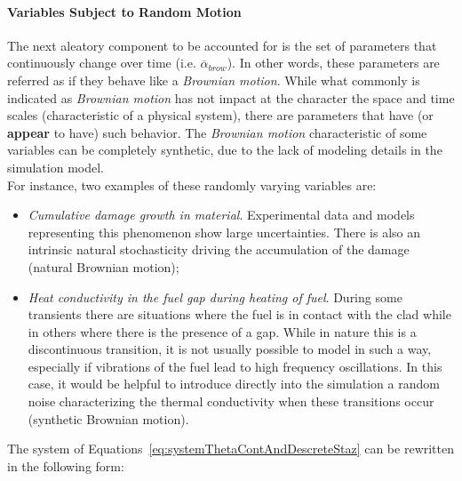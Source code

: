 \paragraph{Variables Subject to Random Motion}
The next aleatory component to be accounted for is the set of parameters that continuously change over time (i.e. $\overline{\alpha}_{brow}$). 
In other words,  these parameters are referred as if they behave like a \textit{Brownian motion}. 
While what commonly is indicated as \textit{Brownian motion} has not impact at the character
the space and time scales (characteristic of a physical system), there are parameters that have (or \textbf{appear} 
to have) such behavior. The  \textit{Brownian motion} characteristic of some variables can be completely 
synthetic, due to the lack of modeling details in the simulation model.
\\For instance, two examples of these randomly varying variables are:
\begin{itemize}
  \item \textit{Cumulative damage growth in material}. Experimental data and models representing this
  phenomenon show large uncertainties. There is also an intrinsic natural stochasticity driving
  the accumulation of the damage (natural Brownian motion);
  \item \textit{Heat conductivity in the fuel gap during heating of fuel}. During some transients there are
  situations where the fuel is in contact with the clad while in others where there is the presence of a gap. While in   
  nature this is a discontinuous transition, it is not usually possible to model in such a way, especially if vibrations 
  of the fuel lead to high frequency oscillations. In this case, it would be helpful to introduce directly into the 
  simulation a random noise characterizing the thermal conductivity when these transitions occur (synthetic 
  Brownian motion).
\end{itemize}
The system of Equations~\ref{eq:systemThetaContAndDescreteStaz} can be rewritten in the following form:

